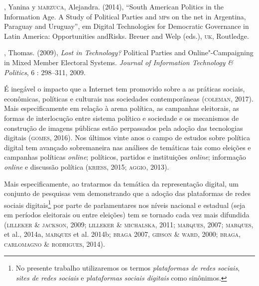 \begin{bibliohedra}
, Yanina y \textsc{marzuca}, Alejandra. (2014), ``South American Politics in
the Information Age. A Study of Political Parties and \textsc{mp}s on the net in
Argentina, Paraguay and Uruguay'', em Digital Technologies for
Democratic Governance in Latin America: Opportunities andRisks. Breuer
and Welp (eds.), \textsc{uk}, Routledge.

, Thomas. (2009), \emph{Lost in Technology?} Political Parties and
Online"-Campaigning in Mixed Member Electoral Systems. \emph{Journal of
Information Technology \& Politics}, 6 : 298--311, 2009.
\end{bibliohedra}



\begin{flushright}
\end{flushright}

\noindent{}É inegável o impacto que a Internet tem promovido sobre a as práticas
sociais, econômicas, políticas e culturais nas sociedades contemporâneas
(\textsc{coleman}, 2017). Mais especificamente em relação à arena política, as
campanhas eleitorais, as formas de interlocução entre sistema político e
sociedade e os mecanismos de construção de imagens públicas estão
perpassados pela adoção das tecnologias digitais (\textsc{gomes}, 2016). Nos
últimos vinte anos o campo de estudos sobre política digital tem
avançado sobremaneira nas análises de temáticas tais como eleições e
campanhas políticas \emph{online}; políticos, partidos e instituições \emph{online};
informação \emph{online} e discussão política (\textsc{kriess}, 2015; \textsc{aggio}, 2013).

Mais especificamente, ao tratarmos da temática da representação digital,
um conjunto de pesquisas vem demonstrando que a adoção das plataformas
de redes sociais digitais\footnote{No presente trabalho utilizaremos os
  termos \textit{plataformas de redes sociais}, \textit{sites de redes sociais} e
  \textit{plataformas sociais digitais} como sinônimos.} por parte de
parlamentares nos níveis nacional e estadual (seja em períodos
eleitorais ou entre eleições) tem se tornado cada vez mais difundida
(\textsc{lilleker \& jackson}, 2009; \textsc{lilleker \& michalska}, 2011; \textsc{marques}, 2007; \textsc{marques}, et al., 2014a, \textsc{marques} et al. 2014b; \textsc{braga} 2007, \textsc{gibson \&
ward}, 2000; \textsc{braga, carlomagno \& rodrigues}, 2014).

